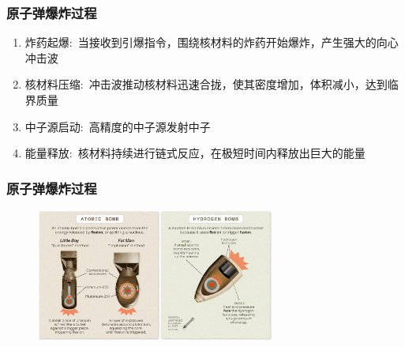 \begin{frame}
    \frametitle{原子弹爆炸过程}
    \begin{enumerate}
		\setlength{\itemsep}{8pt}
	    \item 炸药起爆:~当接收到引爆指令，围绕核材料的炸药开始爆炸，产生强大的向心冲击波\\
		    {\fontsize{7.2pt}{6.2pt}}
        \item 核材料压缩:~冲击波推动核材料迅速合拢，使其密度增加，体积减小，达到临界质量\\
		{\fontsize{7.2pt}{6.2pt}\selectfont{核材料中的中子引发核裂变的概率大幅提高}}
        \item 中子源启动:~高精度的中子源发射中子\\
		{\fontsize{7.2pt}{6.2pt}\selectfont{中子迅速轰击处于超临界状态的核材料，引发链式反应}}
        \item 能量释放:~核材料持续进行链式反应，在极短时间内释放出巨大的能量\\
		{\fontsize{7.2pt}{6.2pt}\selectfont{形成强烈的光辐射、高速运动的冲击波以及具有强穿透性的核辐射}}
    \end{enumerate}
\end{frame}

\begin{frame}
    \frametitle{原子弹爆炸过程}
    \vspace{-0.4cm}
    \begin{figure}
        \includegraphics[width=0.7\textwidth,viewport=0 0 170 180,clip]{Figures_History/Nuclear_bomb.png}
    \end{figure}
\end{frame}

